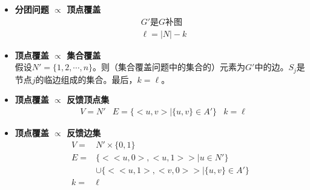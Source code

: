 \documentclass[twocolumn]{article}
\theoremstyle{nonumberplain}%
\begin{document}
\begin{itemize}
    \item {\bf 分团问题 $\propto$ 顶点覆盖}
        \begin{equation}\nonumber %
        \begin{aligned}
        & G' \text{是}G\text{补图}\\
        & \ell=|N|-k
        \end{aligned}
        \end{equation}

    \item {\bf 顶点覆盖 $\propto$ 集合覆盖}\\

        假设$N'=\{1,2,\cdots,n\}$。则（集合覆盖问题中的集合的）元素为$G'$中的边。$S_j$是节点$j$的临边组成的集合。最后，$k=\ell$。

    \item {\bf 顶点覆盖 $\propto$ 反馈顶点集}
        \begin{equation}\nonumber %
        \begin{aligned}
        & V=N'
        & E=\{<u,v>|\{u,v\}\in A'\}
        & k=\ell
        \end{aligned}
        \end{equation}

    \item {\bf 顶点覆盖 $\propto$ 反馈边集}
        \begin{equation}\nonumber %
        \begin{aligned}
        V=&N'\times\{0,1\}\\
        E=&\{<<u,0>,<u,1>>|u\in N'\}\\
          &\cup\{<<u,1>,<v,0>>|\{u,v\}\in A'\}\\
        k=&\ell
        \end{aligned}
        \end{equation}


\end{itemize}
\end{document}
